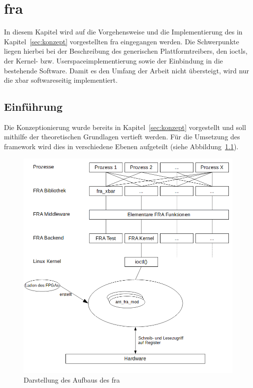 \chapter{\acl{fra}} \label{sec:haupt}
In diesem Kapitel wird auf die  Vorgehensweise und die Implementierung des in Kapitel~\ref{sec:konzept} vorgestellten \ac{fra} eingegangen werden. Die Schwerpunkte liegen hierbei bei der Beschreibung des generischen Plattformtreibers, den \ac{ioctl}s, der Kernel- bzw. Userspaceimplementierung sowie der Einbindung in die bestehende Software. Damit es den Umfang der Arbeit nicht übersteigt, wird nur die \ac{xbar} softwareseitig implementiert.

\section{Einführung}
Die Konzeptionierung wurde bereits in Kapitel~\ref{sec:konzept} vorgestellt und soll mithilfe der theoretischen Grundlagen vertieft werden. Für die Umsetzung des \gls{framework} wird dies in verschiedene Ebenen aufgeteilt (siehe Abbildung~\ref{fig:overview}). 

\begin{figure}[!hbtp]
	\centering
	\includegraphics[width = \linewidth]{pictures/2019-11-17_FRA_Overview.png}
	\smallskip
	\caption{Darstellung des Aufbaus des \ac{fra}}
	\label{fig:overview}
\end{figure} 

